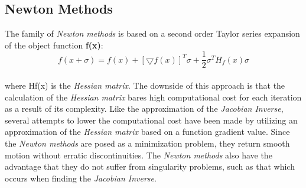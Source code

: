 \subsection{Newton Methods}
The family of \textit{Newton methods} is based on a second order Taylor series expansion of the object function \textbf{f(x)}:\\
\begin{equation}
f(x+\sigma)= f(x)+ [\bigtriangledown f(x)]^{T}\sigma + \frac{1}{2}\sigma^{T}H_{f}(x)\sigma
\end{equation}
\\where Hf(x) is the \textit{Hessian matrix}. The downside of this approach is that the calculation of the \textit{Hessian matrix} bares high computational cost for each iteration as a result of its complexity. Like the approximation of the \textit{Jacobian Inverse}, several attempts to lower the computational cost have been made by utilizing an approximation of the \textit{Hessian matrix} based on a function gradient value.
Since the \textit{Newton methods} are posed as a minimization problem, they return smooth motion without erratic discontinuities.
The \textit{Newton methods} also have the advantage that they do not suffer from singularity problems, such as that which occurs when finding the \textit{Jacobian Inverse}.

